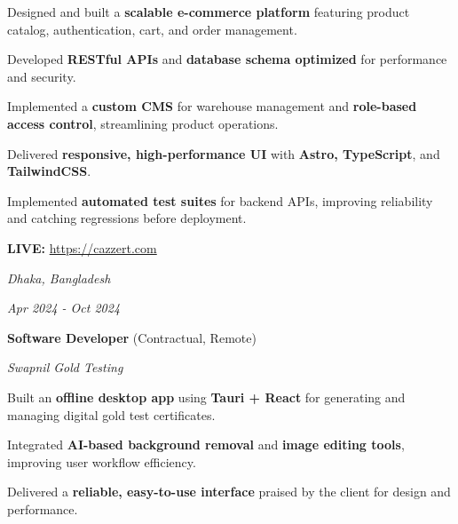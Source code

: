     \vspace{0.10 cm}
    \begin{onecolentry}
        \begin{highlights}
            \item Designed and built a \textbf{scalable e-commerce platform} featuring product catalog, authentication, cart, and order management.
            \item Developed \textbf{RESTful APIs} and \textbf{database schema optimized} for performance and security.
            \item Implemented a \textbf{custom CMS} for warehouse management and \textbf{role-based access control}, streamlining product operations.
            \item Delivered \textbf{responsive, high-performance UI} with \textbf{Astro, TypeScript}, and \textbf{TailwindCSS}.
            \item Implemented \textbf{automated test suites} for backend APIs, improving reliability and catching regressions before deployment.
            \item \textbf{LIVE:} \url{https://cazzert.com}
        \end{highlights}
    \end{onecolentry}


    \vspace{0.2 cm}

    \begin{twocolentry}{
    \textit{Dhaka, Bangladesh}

    \textit{Apr 2024 - Oct 2024}}
        \textbf{Software Developer} (Contractual, Remote)
        
        \textit{Swapnil Gold Testing}
    \end{twocolentry}

    \vspace{0.10 cm}
    \begin{onecolentry}
        \begin{highlights}
            \item Built an \textbf{offline desktop app} using \textbf{Tauri + React} for generating and managing digital gold test certificates.
            \item Integrated \textbf{AI-based background removal} and \textbf{image editing tools}, improving user workflow efficiency.
            \item Delivered a \textbf{reliable, easy-to-use interface} praised by the client for design and performance.
        \end{highlights}
    \end{onecolentry}
